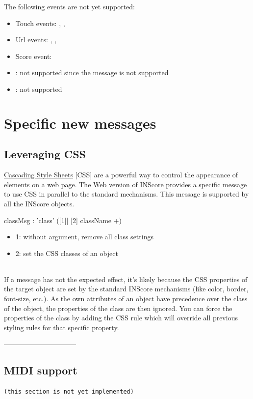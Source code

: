 \documentclass[a4paper,twoside]{article}
\newcommand{\toplevel}[1]	{\section{#1}}
\newcommand{\sublevel}[1]	{\subsection{#1}}
\newcommand{\inprogress}[1]	{{\color{blue} \texttt{(#1)}}}
\begin{document}
The following events are not yet supported:
\begin{itemize}
\item Touch events: , , 
\item Url events: , , 
\item Score event: 
\item {}: not supported since the  message is not supported
\item {}: not supported
\end{itemize}

\toplevel{Specific new messages}
\label{newMessages}

\sublevel{Leveraging CSS}
\label{webCSS}

\href{https://www.w3schools.com/css/css_intro.asp}{Cascading Style Sheets} [CSS] are a powerful way to control the appearance of elements on a web page. The Web version of INScore provides a specific  message to use CSS in parallel to the standard mechanisms. This message is supported by all the INScore objects.

\begin{rail}
classMsg : 'class' ([1]| [2] className +)
\end{rail}

\begin{itemize}
\item 1: without argument, remove all class settings
\item 2: set the CSS classes of an object
\end{itemize}

\note{}\\
If a  message has not the expected effect, it's likely because the CSS properties of the target object are set by the standard INScore mechanisms (like color, border, font-size, etc.). As the own attributes of an object have precedence over the class of the object, the properties of the class are then ignored. You can force the properties of the class by adding the CSS rule  which will override all previous styling rules for that specific property.


--------------------------------
\sublevel{MIDI support}
\label{webMIDI}

\inprogress{this section is not yet implemented}
\end{document}
